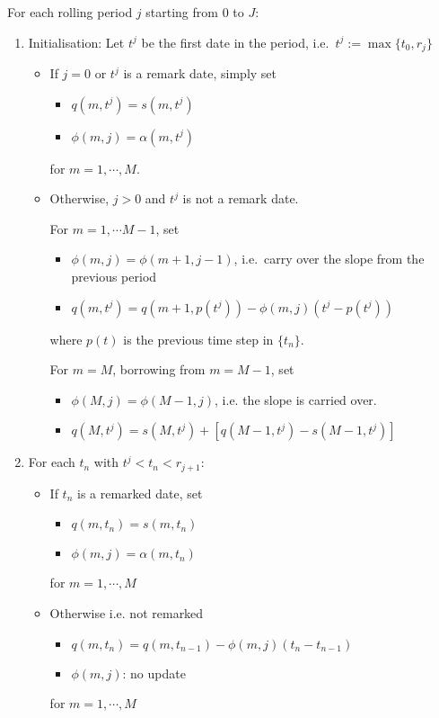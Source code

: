 \documentclass[12pt]{article}
\begin{document}
For each rolling period $j$ starting from $0$ to $J$:
\begin{enumerate}
    \item Initialisation: Let $t^j$ be the first date in the period, i.e.\ $t^j := \max\{t_0, r_j\}$ 
    \begin{itemize}
        \item If $j = 0$ or $t^j$ is a remark date, simply set 
        \begin{itemize}
            \item $q(m,t^j) = s(m, t^j)$
            \item $\phi(m, j) = \alpha(m, t^j)$
        \end{itemize}
        for $m = 1, \cdots, M$.
        \item Otherwise, $j > 0$ and $t^j$ is not a remark date. 
        
        For $m = 1, \cdots M-1$, set
        \begin{itemize}
            \item $\phi(m, j) = \phi(m+1, j-1)$, i.e.\ carry over the slope from the previous period
            \item $q(m,t^j) = q(m + 1, p(t^j)) - \phi(m,j) (t^j - p(t^j))$
        \end{itemize}
        where $p(t)$ is the previous time step in $\{t_n\}$. 

        For $m = M$, borrowing from $m = M-1$, set
        \begin{itemize}
            \item $\phi(M, j) = \phi(M-1, j)$, i.e. the slope is carried over. 
            \item $q(M,t^j) = s(M, t^j) + [q(M-1,t^j) - s(M-1,t^j)]$
        \end{itemize}

    \end{itemize}

    \item For each $t_n$ with $t^j < t_n < r_{j+1}$: 
    \begin{itemize}
        \item If $t_n$ is a remarked date, set
        \begin{itemize}
            \item $q(m,t_n) = s(m, t_n)$
            \item $\phi(m, j) = \alpha(m, t_n)$
        \end{itemize}
        for $m = 1, \cdots, M$
        \item Otherwise i.e. not remarked

        \begin{itemize}
            \item $q(m,t_n) = q(m, t_{n-1}) - \phi(m,j) (t_{n} - t_{n-1})$
        
            \item $\phi(m, j)$: no update
        \end{itemize}
        for $m = 1, \cdots, M$


            
    \end{itemize}
\end{enumerate}
\end{document}
